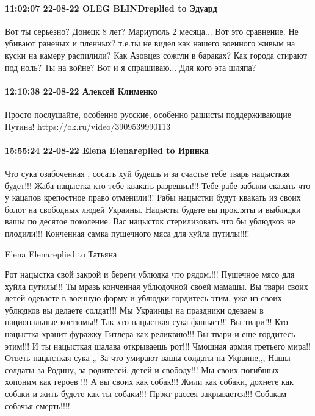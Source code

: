 \paragraph{11:02:07 22-08-22 OLEG BLINDreplied to Эдуард}

Вот ты серьёзно? Донецк 8 лет? Мариуполь 2 месяца... Вот это сравнение. Не
убивают раненых и пленных? т.е.ты не видел как нашего военного живым на куски
на камеру распилили? Как Азовцев сожгли в бараках? Как города стирают под ноль?
Ты на войне? Вот и я спрашиваю... Для кого эта шляпа?

\paragraph{12:10:38 22-08-22 Алексей Клименко}

Просто послушайте, особенно русские, особенно рашисты поддерживающие Путина!
\url{https://ok.ru/video/3909539990113}

\paragraph{15:55:24 22-08-22 Elena Elenareplied to Иринка}

Что сука озабоченная , сосать хуй будешь и за счастье тебе тварь нацысткая
будет!!! Жаба нацыстка кто тебе квакать разрешил!!! Тебе рабе забыли сказать
что у кацапов крепостное право отменили!!! Рабы нацыстки будут квакать из своих
болот на свободных людей Украины. Нацысты будьте вы прокляты и выблядки вашы по
десятое поколение. Вас нацысток стерилизовать что бы ублюдков не плодили!!!
Конченная самка пушечного мяса для хуйла путилы!!!!

Elena Elenareplied to Татьяна

Рот нацыстка свой закрой и береги ублюдка что рядом.!!! Пушечное мясо для хуйла
путилы!!! Ты мразь конченная ублюдочной своей мамашы. Вы твари своих детей
одеваете в военную форму и ублюдки гордитесь этим, уже из своих ублюдков вы
делаете солдат!!! Мы Украинцы на праздники одеваем в национальные костюмы!! Так
хто нацысткая сука фашыст!!! Вы твари!!! Кто нацыстка хранит фуражку Гитлера
как реликвию!!! Вы твари и еще гордитесь этим!!! И ты нацысткая шалава
открываешь рот!!! Чмошная армия третьего мира!! Ответь нацысткая сука ,, За что
умирают вашы солдаты на Украине,,, Нашы солдаты за Родину, за родителей, детей
и свободу!!! Мы своих погибшых хопоним как героев !!! А вы своих как собак!!!
Жили как собаки, дохнете как собаки и жить будете как ты собаки!!! Прэкт рассея
закрывается!!! Собакам собачья смерть!!!!

